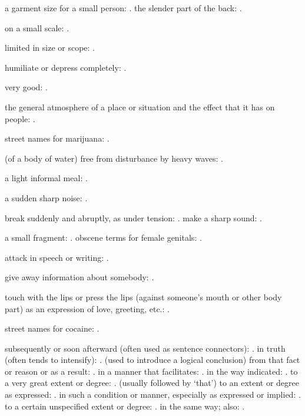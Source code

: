   a garment size for a small person: . the slender part of the back: .

  on a small scale: .

  limited in size or scope: .

  humiliate or depress completely: .

  very good: .

  the general atmosphere of a place or situation and the effect that it has on people: .

  street names for marijuana: .

  (of a body of water) free from disturbance by heavy waves: .

  a light informal meal: .

  a sudden sharp noise: .

  break suddenly and abruptly, as under tension: . make a sharp sound: .

  a small fragment: . obscene terms for female genitals: .

  attack in speech or writing: .

  give away information about somebody: .

  touch with the lips or press the lips (against someone's mouth or other body part) as an expression of love, greeting, etc.: .

  street names for cocaine: .

  subsequently or soon afterward (often used as sentence connectors): . in truth (often tends to intensify): . (used to introduce a logical conclusion) from that fact or reason or as a result: . in a manner that facilitates: . in the way indicated: . to a very great extent or degree: . (usually followed by `that') to an extent or degree as expressed: . in such a condition or manner, especially as expressed or implied: . to a certain unspecified extent or degree: . in the same way; also: .

